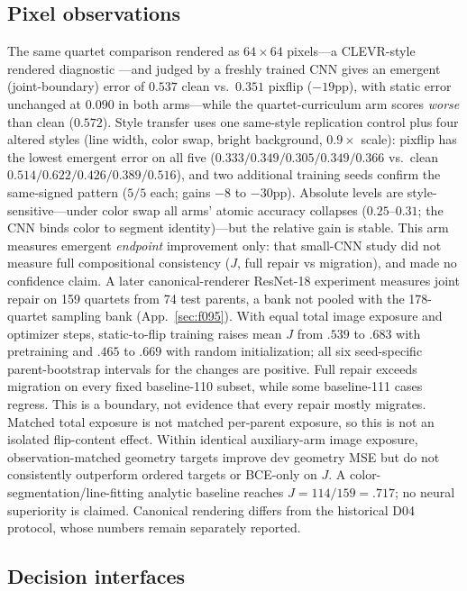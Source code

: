 \subsection{Pixel observations}
\label{sec:pixel}

The same quartet comparison rendered as $64\times64$ pixels---a CLEVR-style rendered diagnostic \citep{johnson2017clevr}---and judged by
a freshly trained CNN gives an emergent (joint-boundary) error of $0.537$
clean vs.\ $0.351$ pixflip ($-19$pp), with static error unchanged at
$0.090$ in both arms---while the quartet-curriculum arm scores
\emph{worse} than clean ($0.572$). Style transfer uses one same-style
replication control plus four altered styles (line width, color swap,
bright background, $0.9\times$ scale): pixflip has the lowest emergent
error on all five ($0.333/0.349/0.305/0.349/0.366$ vs.\ clean
$0.514/0.622/0.426/0.389/0.516$), and two additional training seeds
confirm the same-signed pattern ($5/5$ each; gains $-8$ to $-30$pp).
Absolute levels are style-sensitive---under color swap all arms' atomic
accuracy collapses ($0.25$--$0.31$; the CNN binds color to segment
identity)---but the relative gain is stable. This arm measures emergent
\emph{endpoint} improvement only: that small-CNN study did not measure full compositional consistency
($J$, full repair vs migration), and made no confidence claim. A later canonical-renderer ResNet-18 experiment measures joint repair on
159 quartets from 74 test parents, a bank not pooled with the 178-quartet
sampling bank (App.~\ref{sec:f095}). With equal total image exposure and
optimizer steps, static-to-flip training raises mean $J$ from $.539$ to
$.683$ with pretraining and $.465$ to $.669$ with random initialization;
all six seed-specific parent-bootstrap intervals for the changes are
positive. Full repair exceeds migration on every fixed baseline-110
subset, while some baseline-111 cases regress. This is a boundary, not
evidence that every repair mostly migrates. Matched total exposure is not
matched per-parent exposure, so this is not an isolated flip-content effect. Within identical auxiliary-arm image
exposure, observation-matched geometry targets improve dev geometry MSE
but do not consistently outperform ordered targets or BCE-only on $J$.
A color-segmentation/line-fitting analytic baseline reaches $J=114/159=.717$;
no neural superiority is claimed. Canonical rendering differs from the
historical D04 protocol, whose numbers remain separately reported.

\subsection{Decision interfaces}
\label{sec:interfaces}

